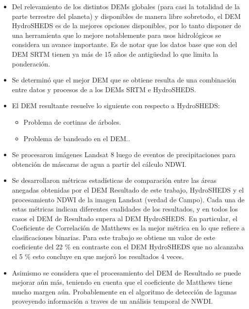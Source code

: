 \documentclass[10pt,a4paper, twoside]{report}
\begin{document}
\begin{itemize}

		\item Del relevamiento de los distintos DEMs globales (para casi la totalidad de la parte terrestre del planeta) y disponibles de manera libre sobretodo, el DEM HydroSHEDS es de la mejores opciones disponibles, por lo tanto disponer de una herramienta que lo mejore notablemente para usos hidrológicos se considera un avance importante. Es de notar que los datos base que son del DEM SRTM tienen ya más de 15 años de antigüedad lo que limita la ponderación.

	\item Se determinó que el mejor DEM que se obtiene resulta de una combinación entre datos y procesos de a los DEMs SRTM e HydroSHEDS.

		
		
	\item El DEM resultante resuelve lo siguiente con respecto a HydroSHEDS:	
		\begin{itemize}
			\item Problema de cortinas de árboles.
			\item Problema de bandeado en el DEM..
		\end{itemize}		
	
		\item Se procesaron imágenes Landsat 8 luego de eventos de precipitaciones para obtención de máscaras de agua a partir del cálculo NDWI.
	
			\item Se desarrollaron métricas estadísticas de comparación entre las áreas anegadas obtenidas por el DEM Resultado de este trabajo, HydroSHEDS y el procesamiento NDWI de la imagen Landsat (verdad de Campo). Cada una de estas métricas indican diferentes cualidades de los resultados, y en todos los casos el DEM de Resultado supera al DEM HydroSHEDS. En particular, el Coeficiente de Correlación de Matthews es la mejor métrica en lo que refiere a clasificaciones binarias. Para este trabajo se obtiene un valor de este coeficiente del 22 \% en contraste con el DEM HydroSHEDS que no alcanzaba el 5 \% esto concluye en que mejoró los resultados 4 veces. 			
			\item Asimismo se considera que el procesamiento del DEM de Resultado se puede mejorar aún más, teniendo en cuenta que el coeficiente de Matthews tiene mucho margen aún. Probablemente en el algoritmo de detección de lagunas proveyendo información a traves de un análisis temporal de NWDI.


\end{itemize}
\end{document}
